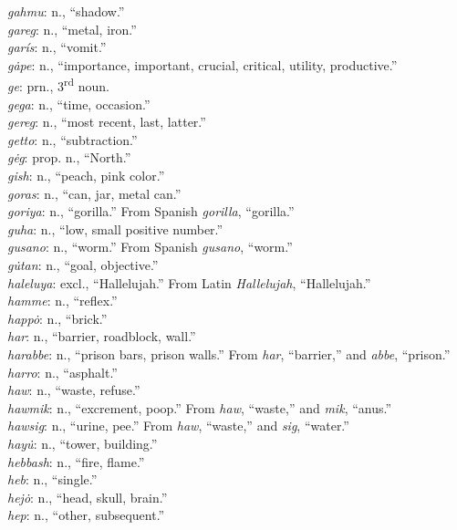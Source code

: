 \documentclass{article}[10pt]
\begin{document}
\begin{multicols}{3}
\emph{gahmu}: n., ``shadow.''\\
\emph{gareg}: n., ``metal, iron.''\\
\emph{gar\'{i}s}: n., ``vomit.''\\
\emph{g\.{a}pe}: n., ``importance, important, crucial, critical, utility, productive.''\\
\emph{ge}:  prn., 3\textsuperscript{rd} noun.\\
\emph{gega}: n., ``time, occasion.''\\
\emph{gereg}: n., ``most recent, last, latter.''\\
\emph{getto}: n., ``subtraction.''\\
\emph{g\.{e}g}: prop. n., ``North.''\\
\emph{gish}: n., ``peach, pink color.''\\
\emph{goras}: n., ``can, jar, metal can.''\\
\emph{goriya}: n., ``gorilla.'' From Spanish \emph{gorilla}, ``gorilla.''\\
\emph{guha}: n., ``low, small positive number.''\\
\emph{gusano}: n., ``worm.'' From Spanish \emph{gusano}, ``worm.''\\
\emph{g\.{u}tan}: n., ``goal, objective.''\\
\emph{haleluya}: excl., ``Hallelujah.'' From Latin \emph{Hallelujah}, ``Hallelujah.''\\
\emph{hamme}: n., ``reflex.''\\
\emph{happ\.{o}}: n., ``brick.''\\
\emph{har}: n., ``barrier, roadblock, wall.''\\
\emph{harabbe}: n., ``prison bars, prison walls.'' From \emph{har}, ``barrier,'' and \emph{abbe}, ``prison.''\\
\emph{harro}: n., ``asphalt.''\\
\emph{haw}: n., ``waste, refuse.''\\
\emph{hawmik}: n., ``excrement, poop.'' From \emph{haw}, ``waste,'' and \emph{mik}, ``anus.''\\
\emph{hawsig}: n., ``urine, pee.'' From \emph{haw}, ``waste,'' and \emph{sig}, ``water.''\\
\emph{hay\.{u}}: n., ``tower, building.''\\
\emph{hebbash}: n., ``fire, flame.''\\
\emph{heb}: n., ``single.''\\
\emph{hej\.{o}}: n., ``head, skull, brain.''\\
\emph{hep}: n., ``other, subsequent.''\\

\end{multicols}
\end{document}
